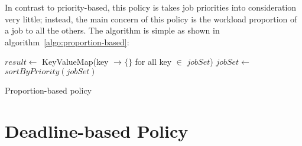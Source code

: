In contrast to priority-based, this policy is takes job priorities into
consideration very little; instead, the main concern of this policy is
the workload proportion of a job to all the others.  The algorithm is
simple as shown in algorithm~\ref{algo:proportion-based}:
\begin{algorithm}
  \DontPrintSemicolon %
  $result \gets$ KeyValueMap(key $\to \{\}$ for all key $\in$
  $jobSet$)\;
  $jobSet \gets$ $sortByPriority(jobSet)$\;
  \;
  \caption{Proportion-based policy}
  \label{algo:proportion-based}
\end{algorithm}



\section{Deadline-based Policy}
